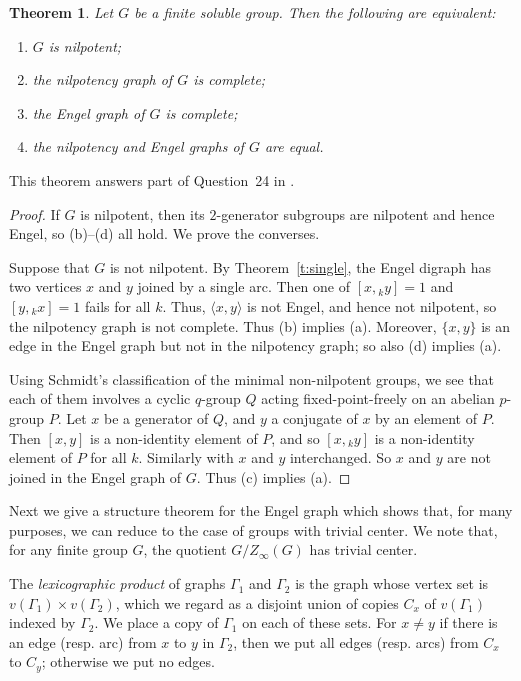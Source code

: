 \documentclass[reqno,12pt]{amsart}
\theoremstyle{plain}
\newtheorem{thm}{Theorem}[section]
\theoremstyle{definition}
\begin{document}
\begin{thm}\label{ad}
Let $G$ be a finite soluble group. Then the following are equivalent:
\begin{enumerate}
\item $G$ is nilpotent;
\item the nilpotency graph of $G$ is complete;
\item the Engel graph of $G$ is complete;
\item the nilpotency and Engel graphs of $G$ are equal.
\end{enumerate}
\end{thm}

This theorem answers part of Question~24 in \cite{Cameron2022}.

\begin{proof}
If $G$ is nilpotent, then its $2$-generator subgroups are nilpotent and hence
Engel, so (b)--(d) all hold. We prove the converses.

Suppose that $G$ is not nilpotent. By Theorem~\ref{t:single}, the Engel digraph
has two vertices $x$ and $y$ joined by a single arc. Then one of
$[x,{}_ky]=1$ and $[y,{}_kx]=1$ fails for all $k$. Thus, $\langle x,y\rangle$ is
not Engel, and hence not nilpotent, so the nilpotency graph is not complete.
Thus (b) implies (a). Moreover, $\{x,y\}$ is an edge in the Engel graph but
not in the nilpotency graph; so also (d) implies (a).

Using Schmidt's classification of
the minimal non-nilpotent groups, we see that each of them involves a cyclic
$q$-group $Q$ acting fixed-point-freely on an abelian $p$-group $P$. Let $x$
be a generator of $Q$, and $y$ a conjugate of $x$ by an element of $P$.
Then $[x,y]$ is a non-identity element of $P$, and so $[x,{}_ky]$ is a
non-identity element of $P$ for all $k$. Similarly with $x$ and $y$
interchanged. So $x$ and $y$ are not joined in the Engel graph of $G$. Thus
(c) implies (a).
\end{proof}

Next we give a structure theorem for the Engel graph which shows that, for many
purposes, we can reduce to the case of groups with trivial center. We note
that, for any finite group $G$, the quotient $G/Z_\infty(G)$ has trivial center.

The \emph{lexicographic product} of graphs $\Gamma_1$ and
$\Gamma_2$ is the graph whose vertex set is $v(\Gamma_1)\times v(\Gamma_2)$,
which we regard as a disjoint union of copies $C_x$ of $v(\Gamma_1)$ indexed by
$\Gamma_2$. We place a copy of $\Gamma_1$ on each of these sets. For $x\ne y$
if there is an edge (resp. arc) from $x$ to $y$ in $\Gamma_2$, then we put
all edges (resp. arcs) from $C_x$ to $C_y$; otherwise we put no edges.
\end{document}
